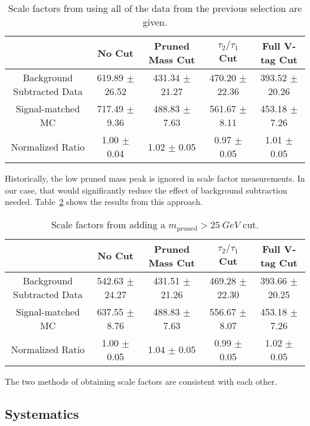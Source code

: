 \documentclass{article}
\begin{document}
\begin{table}[h]
  \caption{Scale factors from using all of the data from the previous selection are given.}
  \begin{tabular}{c | c | c | c | c}
    \hline
    & No Cut & Pruned Mass Cut & $\tau_2/\tau_1$ Cut & Full V-tag Cut \\
    \hline
    Background Subtracted Data & 619.89 $\pm$ 26.52 & 431.34 $\pm$ 21.27 & 470.20 $\pm$ 22.36 & 393.52 $\pm$ 20.26 \\
    Signal-matched MC & 717.49 $\pm$ 9.36 & 488.83 $\pm$ 7.63 & 561.67 $\pm$ 8.11 & 453.18 $\pm$ 7.26 \\
    \hline
    Normalized Ratio & 1.00 $\pm$ 0.04 & 1.02 $\pm$ 0.05 & 0.97 $\pm$ 0.05 & 1.01 $\pm$ 0.05 \\
    \hline
  \end{tabular}
  \label{tab:wscale_res}
\end{table}

Historically, the low pruned mass peak is ignored in scale factor measurements. 
In our case, that would significantly reduce the effect of background subtraction needed.
Table~\ref{tab:wscale_hmm} shows the results from this approach.

\begin{table}[h]
  \caption{Scale factors from adding a $m_\text{pruned} > \SI{25}{GeV}$ cut.}
  \begin{tabular}{c | c | c | c | c}
    \hline
    & No Cut & Pruned Mass Cut & $\tau_2/\tau_1$ Cut & Full V-tag Cut \\
    \hline
    Background Subtracted Data & 542.63 $\pm$ 24.27 & 431.51 $\pm$ 21.26 & 469.28 $\pm$ 22.30 & 393.66 $\pm$ 20.25 \\
    Signal-matched MC & 637.55 $\pm$ 8.76 & 488.83 $\pm$ 7.63 & 556.67 $\pm$ 8.07 & 453.18 $\pm$ 7.26 \\
    \hline
    Normalized Ratio & 1.00 $\pm$ 0.05 & 1.04 $\pm$ 0.05 & 0.99 $\pm$ 0.05 & 1.02 $\pm$ 0.05 \\
    \hline
  \end{tabular}
  \label{tab:wscale_hmm}
\end{table}

The two methods of obtaining scale factors are consistent with each other.

\subsection{Systematics}


  
\end{document}
